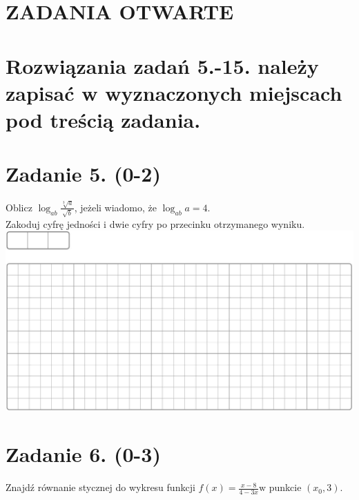 \documentclass[10pt]{article}
\begin{document}
\section*{ZADANIA OTWARTE}
\section*{Rozwiązania zadań 5.-15. należy zapisać w wyznaczonych miejscach pod treścią zadania.}
\section*{Zadanie 5. (0-2)}
Oblicz \(\log _{a b} \frac{\sqrt[3]{a}}{\sqrt{b}}\), jeżeli wiadomo, że \(\log _{a b} a=4\).\\
Zakoduj cyfrę jedności i dwie cyfry po przecinku otrzymanego wyniku.\\
\includegraphics[max width=\textwidth, center]{2024_11_21_599d917d55a506aace4bg-04}

\section*{Zadanie 6. (0-3)}
Znajdź równanie stycznej do wykresu funkcji \(f(x)=\frac{x-8}{4-3 x} \mathrm{w}\) punkcie \(\left(x_{0}, 3\right)\).
\end{document}
